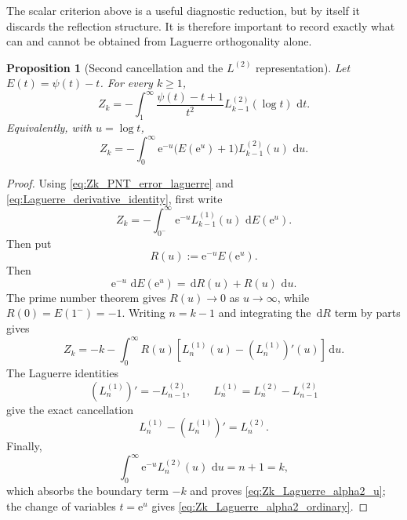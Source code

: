 \documentclass[11pt]{amsart}
\numberwithin{equation}{section}
\theoremstyle{plain}
\newtheorem{proposition}[theorem]{Proposition}
\theoremstyle{definition}
\theoremstyle{remark}
\newcommand{\e}{\mathrm e}
\newcommand{\dd}{\,\mathrm d}
\begin{document}
The scalar criterion above is a useful diagnostic reduction, but by itself it discards the reflection structure.  It is therefore important to record exactly what can and cannot be obtained from Laguerre orthogonality alone.

\begin{proposition}[Second cancellation and the $L^{(2)}$ representation]
\label{prop:Zk_second_cancellation_L2}
Let $E(t)=\psi(t)-t$.  For every $k\ge1$,
\begin{equation}
 \boxed{
 Z_k=-\int_1^\infty
 \frac{\psi(t)-t+1}{t^2}
 L_{k-1}^{(2)}(\log t)\,\dd t.}
 \label{eq:Zk_Laguerre_alpha2_ordinary}
\end{equation}
Equivalently, with $u=\log t$,
\begin{equation}
 Z_k=-\int_0^\infty
 \e^{-u}\bigl(E(\e^u)+1\bigr)L_{k-1}^{(2)}(u)\,\dd u.
 \label{eq:Zk_Laguerre_alpha2_u}
\end{equation}
\end{proposition}

\begin{proof}
Using \eqref{eq:Zk_PNT_error_laguerre} and \eqref{eq:Laguerre_derivative_identity}, first write
\begin{equation}
 Z_k=-\int_{0^-}^{\infty}\e^{-u}L_{k-1}^{(1)}(u)\,\dd E(\e^u).
 \label{eq:Zk_alpha1_before_second_cancellation}
\end{equation}
Then put
\begin{equation}
 R(u):=\e^{-u}E(\e^u).
\end{equation}
Then
\begin{equation}
 \e^{-u}\,\dd E(\e^u)=\dd R(u)+R(u)\,\dd u.
\end{equation}
The prime number theorem gives $R(u)\to0$ as $u\to\infty$, while $R(0)=E(1^-)=-1$.  Writing $n=k-1$ and integrating the $\dd R$ term by parts gives
\begin{equation}
 Z_k=-k-\int_0^\infty R(u)
 \left[L_n^{(1)}(u)-(L_n^{(1)})'(u)\right]\dd u.
\end{equation}
The Laguerre identities
\begin{equation}
 (L_n^{(1)})'=-L_{n-1}^{(2)},
 \qquad
 L_n^{(1)}=L_n^{(2)}-L_{n-1}^{(2)}
\end{equation}
give the exact cancellation
\begin{equation}
 L_n^{(1)}-(L_n^{(1)})'=L_n^{(2)}.
\end{equation}
Finally,
\begin{equation}
 \int_0^\infty \e^{-u}L_n^{(2)}(u)\,\dd u=n+1=k,
\end{equation}
which absorbs the boundary term $-k$ and proves \eqref{eq:Zk_Laguerre_alpha2_u}; the change of variables $t=\e^u$ gives \eqref{eq:Zk_Laguerre_alpha2_ordinary}.
\end{proof}
\end{document}

